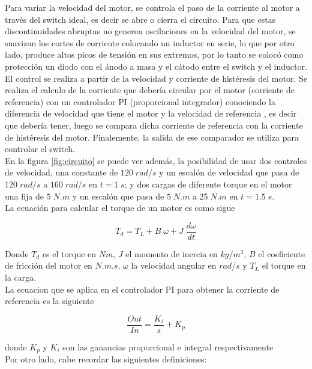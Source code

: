 \documentclass[11pt, a4paper]{article}
\begin{document}
Para variar la velocidad del motor, se controla el paso de la corriente al motor a través del switch ideal, es decir se abre o cierra el circuito. Para que estas discontinuidades abruptas no generen oscilaciones en la velocidad del motor, se suavizan los cortes de corriente colocando un inductor en serie, lo que por otro lado, produce altos picos de tensión en sus extremos, por lo tanto se colocó como protección un diodo con el ánodo a masa y el cátodo entre el switch y el inductor.\\
El control se realiza a partir de la velocidad y corriente de histéresis del motor. Se realiza el calculo de la corriente que debería circular por el motor (corriente de referencia) con un controlador PI (proporcional integrador) conociendo la diferencia de velocidad que tiene el motor y la velocidad de referencia , es decir que debería tener, luego se compara dicha corriente de referencia con la corriente de histéresis del motor. Finalemente, la salida de ese comparador se utiliza para controlar el switch.\\
En la figura \ref{fig:circuito} se puede ver además, la posibilidad de usar dos controles de velocidad, una constante de $120\;rad/s$ y un escalón de velocidad que pasa de $120\;rad/s$ a $160\;rad/s$ en $t=1\;s$; y dos cargas de diferente torque en el motor una fija de $5\;N.m$ y un escalón que pasa de $5\;N.m$ a $25\;N.m$ en $t=1.5\;s$.\\

La ecuación  para calcular el torque de un motor es como sigue

\begin{equation}
T_d=T_L+B\;\omega+J\;\frac{d\omega}{dt}
\label{eq:par}
\end{equation}

Donde $T_d$ es el torque en $Nm$, $J$ el momento de inercia en $kg/m^2$, $B$ el coeficiente de fricción del motor en $N.m.s$, $\omega$ la velocidad angular en $rad/s$ y $T_L$ el torque en la carga.\\
La ecuacion que se aplica en el controlador PI para obtener la corriente de referencia es la siguiente

\begin{equation}
\frac{Out}{In}=\frac{K_i}{s}+K_p
\end{equation}

donde $K_p$ y $K_i$ son las ganancias proporcional e integral respectivamente\\


Por otro lado, cabe recordar las siguientes definiciones:
\end{document}

